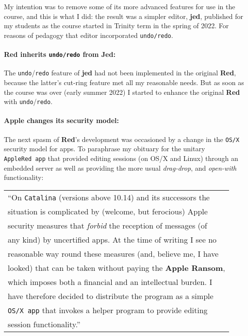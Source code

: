 \documentclass[
]{article}
\begin{document}
My intention was to remove some of its more advanced features for use in
the course, and this is what I did: the result was a simpler editor,
\textbf{jed}, published for my students as the course started in Trinity
term in the spring of 2022. For reasons of pedagogy that editor
incorporated \texttt{undo/redo}.

\hypertarget{red-inherits-undoredo-from-jed}{%
\paragraph{\texorpdfstring{Red inherits \texttt{undo/redo} from
Jed:}{Red inherits undo/redo from Jed:}}\label{red-inherits-undoredo-from-jed}}

The \texttt{undo}/\texttt{redo} feature of \textbf{jed} had not been
implemented in the original \textbf{Red}, because the latter's cut-ring
feature met all my reasonable needs. But as soon as the course was over
(early summer 2022) I started to enhance the original \textbf{Red} with
\texttt{undo}/\texttt{redo}.

\hypertarget{apple-changes-its-security-model}{%
\paragraph{Apple changes its security
model:}\label{apple-changes-its-security-model}}

The next spasm of \textbf{Red}'s development was occasioned by a change
in the \texttt{OS/X} security model for apps. To paraphrase my obituary
for the unitary \texttt{AppleRed\ app} that provided editing sessions
(on OS/X and Linux) through an embedded server as well as providing the
more usual \emph{drag-drop}, and \emph{open-with} functionality:

\begin{longtable}[]{@{}l@{}}
\toprule
\endhead
``On \texttt{Catalina} (versions above 10.14) and its successors
the\tabularnewline
situation is complicated by (welcome, but ferocious)
Apple\tabularnewline
security measures that \emph{forbid} the reception of messages
(of\tabularnewline
any kind) by uncertified apps. At the time of writing I see
no\tabularnewline
reasonable way round these measures (and, believe me, I
have\tabularnewline
looked) that can be taken without paying the \textbf{Apple
Ransom},\tabularnewline
which imposes both a financial and an intellectual burden.
I\tabularnewline
have therefore decided to distribute the program as a
simple\tabularnewline
\texttt{OS/X\ app} that invokes a helper program to provide
editing\tabularnewline
session functionality.''\tabularnewline
\bottomrule
\end{longtable}
\end{document}
